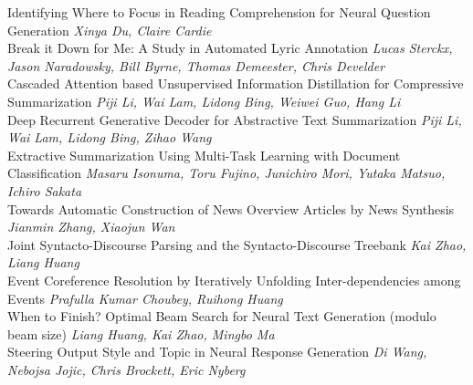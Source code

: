 \documentclass{book}
\begin{document}
    \noindent	Identifying Where to Focus in Reading Comprehension for Neural Question Generation \newline 
    {\itshape Xinya Du, Claire Cardie} \\
    
    \noindent	Break it Down for Me: A Study in Automated Lyric Annotation \newline 
    {\itshape Lucas Sterckx, Jason Naradowsky, Bill Byrne, Thomas Demeester, Chris Develder} \\
    
    \noindent	Cascaded Attention based Unsupervised Information Distillation for Compressive Summarization \newline 
    {\itshape Piji Li, Wai Lam, Lidong Bing, Weiwei Guo, Hang Li} \\
    
    \noindent	Deep Recurrent Generative Decoder for Abstractive Text Summarization \newline 
    {\itshape Piji Li, Wai Lam, Lidong Bing, Zihao Wang} \\
    
    \noindent	Extractive Summarization Using Multi-Task Learning with Document Classification \newline 
    {\itshape Masaru Isonuma, Toru Fujino, Junichiro Mori, Yutaka Matsuo, Ichiro Sakata} \\
    
    \noindent	Towards Automatic Construction of News Overview Articles by News Synthesis \newline 
    {\itshape Jianmin Zhang, Xiaojun Wan} \\
    
    \noindent	Joint Syntacto-Discourse Parsing and the Syntacto-Discourse Treebank \newline 
    {\itshape Kai Zhao, Liang Huang} \\
    
    \noindent	Event Coreference Resolution by Iteratively Unfolding Inter-dependencies among Events \newline 
    {\itshape Prafulla Kumar Choubey, Ruihong Huang} \\
    
    \noindent	When to Finish? Optimal Beam Search for Neural Text Generation (modulo beam size) \newline 
    {\itshape Liang Huang, Kai Zhao, Mingbo Ma} \\
    
    \noindent	Steering Output Style and Topic in Neural Response Generation \newline 
    {\itshape Di Wang, Nebojsa Jojic, Chris Brockett, Eric Nyberg} \\
    
\end{document}
